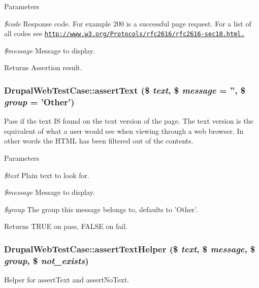 \begin{DoxyParams}{Parameters}
\item[{\em \$code}]Response code. For example 200 is a successful page request. For a list of all codes see \href{http://www.w3.org/Protocols/rfc2616/rfc2616-sec10.html.}{\tt http://www.w3.org/Protocols/rfc2616/rfc2616-\/sec10.html.} \item[{\em \$message}]Message to display. \end{DoxyParams}
\begin{DoxyReturn}{Returns}
Assertion result. 
\end{DoxyReturn}
\hypertarget{class_drupal_web_test_case_ad721f3f08df154f1ccaf7b8ab0d2d9d0}{
\subsubsection[{assertText}]{\setlength{\rightskip}{0pt plus 5cm}DrupalWebTestCase::assertText (\$ {\em text}, \/  \$ {\em message} = {\ttfamily ''}, \/  \$ {\em group} = {\ttfamily 'Other'})}}
\label{class_drupal_web_test_case_ad721f3f08df154f1ccaf7b8ab0d2d9d0}
Pass if the text IS found on the text version of the page. The text version is the equivalent of what a user would see when viewing through a web browser. In other words the HTML has been filtered out of the contents.


\begin{DoxyParams}{Parameters}
\item[{\em \$text}]Plain text to look for. \item[{\em \$message}]Message to display. \item[{\em \$group}]The group this message belongs to, defaults to 'Other'. \end{DoxyParams}
\begin{DoxyReturn}{Returns}
TRUE on pass, FALSE on fail. 
\end{DoxyReturn}
\hypertarget{class_drupal_web_test_case_a870c322ff86add51471f4b39905111d7}{
\subsubsection[{assertTextHelper}]{\setlength{\rightskip}{0pt plus 5cm}DrupalWebTestCase::assertTextHelper (\$ {\em text}, \/  \$ {\em message}, \/  \$ {\em group}, \/  \$ {\em not\_\-exists})}}
\label{class_drupal_web_test_case_a870c322ff86add51471f4b39905111d7}
Helper for assertText and assertNoText.

